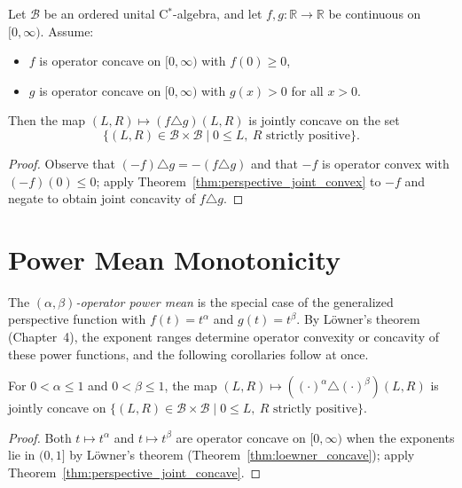 \begin{theorem}
  \label{thm:perspective_joint_concave}
  \leanok
  Let $\mathcal{B}$ be an ordered unital C$^*$-algebra, and let
  $f, g : \mathbb{R} \to \mathbb{R}$ be continuous on $[0,\infty)$.
  Assume:
  \begin{itemize}
    \item $f$ is operator concave on $[0,\infty)$ with $f(0) \geq 0$,
    \item $g$ is operator concave on $[0,\infty)$ with $g(x) > 0$ for all $x > 0$.
  \end{itemize}
  Then the map $(L, R) \mapsto (f \triangle g)(L, R)$ is jointly concave on the set
  \[
    \{ (L, R) \in \mathcal{B} \times \mathcal{B} \mid 0 \leq L,\ R \text{ strictly positive} \}.
  \]
  \begin{proof}
    \leanok
    Observe that $(-f) \triangle g = -(f \triangle g)$ and that $-f$ is operator
    convex with $(-f)(0) \leq 0$; apply Theorem~\ref{thm:perspective_joint_convex}
    to $-f$ and negate to obtain joint concavity of $f \triangle g$.
  \end{proof}
\end{theorem}

\section{Power Mean Monotonicity}

The \emph{$(\alpha,\beta)$-operator power mean} is the special case of the generalized
perspective function with $f(t) = t^\alpha$ and $g(t) = t^\beta$.
By L\"{o}wner's theorem (Chapter~4), the exponent ranges determine operator
convexity or concavity of these power functions, and the following corollaries
follow at once.

\begin{theorem}
  \label{thm:power_mean_concave}
  \leanok
  For $0 < \alpha \leq 1$ and $0 < \beta \leq 1$, the map
  $(L, R) \mapsto ((\cdot)^\alpha \triangle (\cdot)^\beta)(L, R)$
  is jointly concave on
  $\{ (L, R) \in \mathcal{B} \times \mathcal{B} \mid 0 \leq L,\ R \text{ strictly positive} \}$.
  \begin{proof}
    \leanok
    Both $t \mapsto t^\alpha$ and $t \mapsto t^\beta$ are operator concave on
    $[0,\infty)$ when the exponents lie in $(0,1]$ by L\"{o}wner's theorem
    (Theorem~\ref{thm:loewner_concave}); apply Theorem~\ref{thm:perspective_joint_concave}.
  \end{proof}
\end{theorem}

